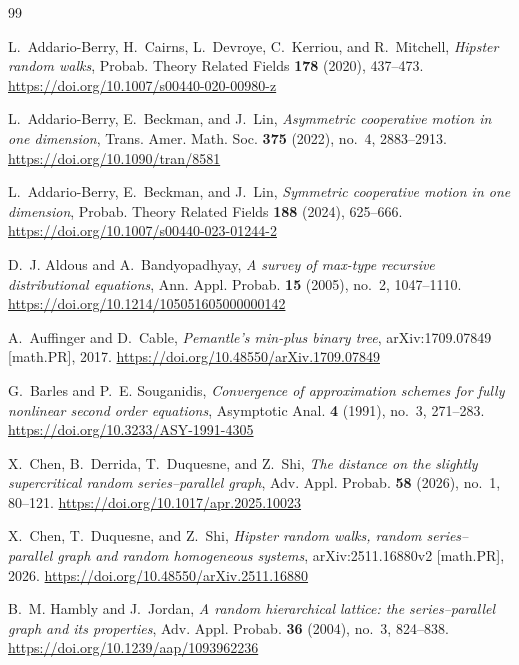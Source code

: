 \documentclass[12pt,preprint]{amsart}
\numberwithin{equation}{section}
\theoremstyle{plain}
\theoremstyle{definition}
\begin{document}
\begin{thebibliography}{99}

L.~Addario-Berry, H.~Cairns, L.~Devroye, C.~Kerriou, and R.~Mitchell,
\emph{Hipster random walks},
Probab. Theory Related Fields \textbf{178} (2020), 437--473.
\url{https://doi.org/10.1007/s00440-020-00980-z}

L.~Addario-Berry, E.~Beckman, and J.~Lin,
\emph{Asymmetric cooperative motion in one dimension},
Trans. Amer. Math. Soc. \textbf{375} (2022), no.~4, 2883--2913.
\url{https://doi.org/10.1090/tran/8581}

L.~Addario-Berry, E.~Beckman, and J.~Lin,
\emph{Symmetric cooperative motion in one dimension},
Probab. Theory Related Fields \textbf{188} (2024), 625--666.
\url{https://doi.org/10.1007/s00440-023-01244-2}

D.~J. Aldous and A.~Bandyopadhyay,
\emph{A survey of max-type recursive distributional equations},
Ann. Appl. Probab. \textbf{15} (2005), no.~2, 1047--1110.
\url{https://doi.org/10.1214/105051605000000142}

A.~Auffinger and D.~Cable,
\emph{Pemantle's min-plus binary tree},
arXiv:1709.07849 [math.PR], 2017.
\url{https://doi.org/10.48550/arXiv.1709.07849}

G.~Barles and P.~E. Souganidis,
\emph{Convergence of approximation schemes for fully nonlinear second order
equations},
Asymptotic Anal. \textbf{4} (1991), no.~3, 271--283.
\url{https://doi.org/10.3233/ASY-1991-4305}

X.~Chen, B.~Derrida, T.~Duquesne, and Z.~Shi,
\emph{The distance on the slightly supercritical random series--parallel graph},
Adv. Appl. Probab. \textbf{58} (2026), no.~1, 80--121.
\url{https://doi.org/10.1017/apr.2025.10023}

X.~Chen, T.~Duquesne, and Z.~Shi,
\emph{Hipster random walks, random series--parallel graph and random homogeneous
systems},
arXiv:2511.16880v2 [math.PR], 2026.
\url{https://doi.org/10.48550/arXiv.2511.16880}

%
%
%
%
%

B.~M. Hambly and J.~Jordan,
\emph{A random hierarchical lattice: the series--parallel graph and its
properties},
Adv. Appl. Probab. \textbf{36} (2004), no.~3, 824--838.
\url{https://doi.org/10.1239/aap/1093962236}


\end{thebibliography}
\end{document}
